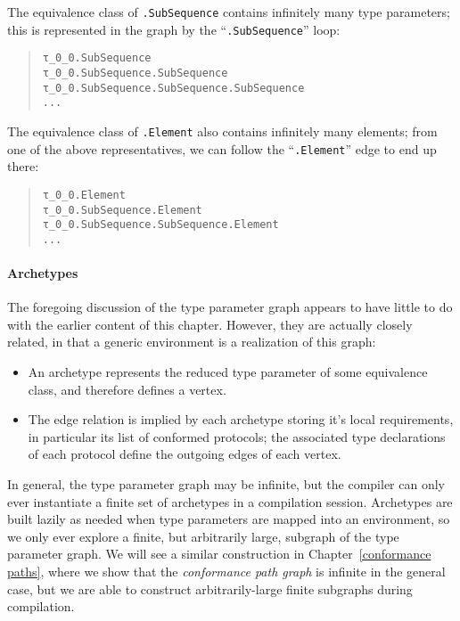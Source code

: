 \documentclass[../generics]{subfiles}
\begin{document}
\begin{example}
\begin{quote}
\begin{tikzpicture}
\end{tikzpicture}
\end{quote}
The equivalence class of \texttt{.SubSequence} contains infinitely many type parameters; this is represented in the graph by the ``\texttt{.SubSequence}'' loop:
\begin{quote}
\begin{verbatim}
τ_0_0.SubSequence
τ_0_0.SubSequence.SubSequence
τ_0_0.SubSequence.SubSequence.SubSequence
...
\end{verbatim}
\end{quote}
The equivalence class of \texttt{.Element} also contains infinitely many elements; from one of the above representatives, we can follow the ``\texttt{.Element}'' edge to end up there:
\begin{quote}
\begin{verbatim}
τ_0_0.Element
τ_0_0.SubSequence.Element
τ_0_0.SubSequence.SubSequence.Element
...
\end{verbatim}
\end{quote}
\end{example}

\paragraph{Archetypes} The foregoing discussion of the type parameter graph appears to have little to do with the earlier content of this chapter. However, they are actually closely related, in that a generic environment is a realization of this graph:
\begin{itemize}
\item An archetype represents the reduced type parameter of some equivalence class, and therefore defines a vertex.
\item The edge relation is implied by each archetype storing it's local requirements, in particular its list of conformed protocols; the associated type declarations of each protocol define the outgoing edges of each vertex.
\end{itemize}
In general, the type parameter graph may be infinite, but the compiler can only ever instantiate a finite set of archetypes in a compilation session. Archetypes are built lazily as needed when type parameters are mapped into an environment, so we only ever explore a finite, but arbitrarily large, subgraph of the type parameter graph. We will see a similar construction in Chapter~\ref{conformance paths}, where we show that the \emph{conformance path graph} is infinite in the general case, but we are able to construct arbitrarily-large finite subgraphs during compilation.
\end{document}
